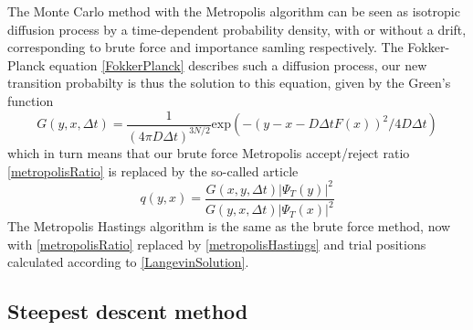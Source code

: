 \documentclass[english, a4paper]{article}
\begin{document}
\noindent The Monte Carlo method with the Metropolis algorithm can be seen as isotropic diffusion process 
by a time-dependent 
probability density, with or without a drift, corresponding to brute force and importance samling respectively.
The Fokker-Planck equation \eqref{FokkerPlanck} describes such a diffusion process, our
new transition probabilty is thus the solution to this equation, given by the Green's function
\begin{equation}
 G(y, x, \Delta t) = \frac{1}{(4\pi D \Delta t)^{3N/2}}
 \textrm{exp}(-(y - x - D\Delta t F(x))^2 / 4D\Delta t)
\end{equation}
which in turn means that our brute force Metropolis accept/reject ratio \eqref{metropolisRatio} is replaced by
the so-called  article
\begin{equation}
 q(y, x) = \frac{G(x, y, \Delta t)|\Psi_T(y)|^2}{G(y, x, \Delta t)|\Psi_T(x)|^2}
 \label{metropolisHastings}
\end{equation}
The Metropolis Hastings algorithm is the same as the brute force method, now with \eqref{metropolisRatio} 
replaced by 
\eqref{metropolisHastings} and trial positions
calculated according to \eqref{LangevinSolution}.


\subsection{Steepest descent method}
\end{document}
